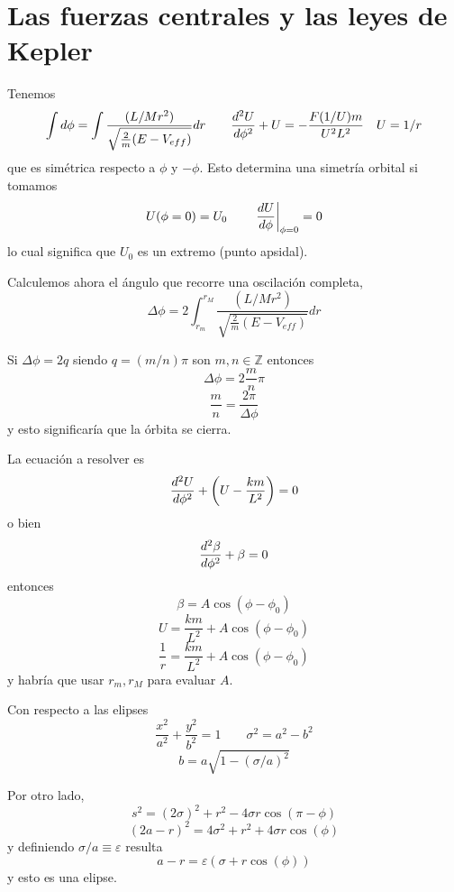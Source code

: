 \documentclass[10pt,oneside]{CBFT_article}
\begin{document}
\section{Las fuerzas centrales y las leyes de Kepler}

Tenemos 
\[
	\int d\phi = \int \frac{(L/Mr^2)}{\sqrt{ \frac{2}{m}(E - V_{eff})}} dr	\qquad
	\dtot[2]{U}{\phi} + U  = - \frac{F(1/U) m}{U^2 L^2} \quad U = 1/r
\]
que es simétrica respecto a $\phi$ y $-\phi$. Esto determina una simetría orbital si
tomamos
\[
	U(\phi=0) = U_0 	\qquad		\left. \dtot{U}{\phi} \right|_{\phi=0}= 0
\]
lo cual significa que $U_0$ es un extremo (punto apsidal).

Calculemos ahora el ángulo que recorre una oscilación completa,
\[
	\Delta \phi = 2\int_{r_m}^{r_M} \frac{(L/Mr^2)}{\sqrt{ \frac{2}{m}(E - V_{eff})}} dr
\]

Si $\Delta \phi = 2 q $ siendo $q= (m/n)\pi $ son $m,n \in \mathbb{Z}$ entonces
\[
	\Delta \phi = 2 \frac{m}{n} \pi 
\]
\[
	\frac{m}{n} = \frac{2\pi}{\Delta \phi}
\]
y esto significaría que la órbita se cierra.

La ecuación a resolver es 
\[
	\dtot[2]{U}{\phi} + \left( U  - \frac{k m}{L^2} \right) = 0
\]
o bien 
\[
	\dtot[2]{\beta}{\phi} + \beta = 0
\]
entonces
\[
	\beta = A \cos( \phi -\phi_0 )
\]
\[
	U = \frac{km}{L^2} +  A \cos( \phi -\phi_0 )
\]
\[
	\frac{1}{r} = \frac{km}{L^2} +  A \cos( \phi -\phi_0 )
\]
y habría que usar $r_m, r_M$ para evaluar $A$.


Con respecto a las elipses
\[
	\frac{x^2}{a^2} + \frac{y^2}{b^2} = 1	\qquad \sigma^2 = a^2 - b^2
\]
\[
	b = a \sqrt{ 1 - (\sigma/a)^2 }
\]

Por otro lado,
\[
	s^2 = (2\sigma)^2 + r^2 - 4\sigma r \cos( \pi - \phi )
\]
\[
	( 2a -r )^2 = 4\sigma^2 + r^2 + 4\sigma r \cos(\phi)
\]
y definiendo $ \sigma/a \equiv \varepsilon$ resulta
\[
	a - r = \varepsilon ( \sigma + r\cos(\phi) )
\]
y esto es una elipse.
\end{document}

